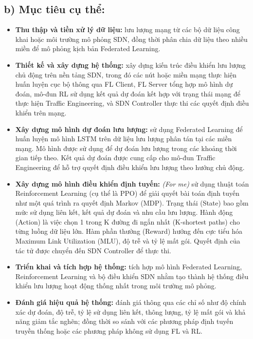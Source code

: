 \subsection*{b) Mục tiêu cụ thể:}
\begin{itemize}
    \item \textbf{Thu thập và tiền xử lý dữ liệu:} lưu lượng mạng từ các bộ dữ liệu công khai hoặc môi trường mô phỏng SDN, đồng thời phân chia dữ liệu theo nhiều miền để mô phỏng kịch bản Federated Learning.

    \item \textbf{Thiết kế và xây dựng hệ thống:} xây dựng kiến trúc điều khiển lưu lượng chủ động trên nền tảng SDN, trong đó các nút hoặc miền mạng thực hiện huấn luyện cục bộ thông qua FL Client, FL Server tổng hợp mô hình dự đoán, mô-đun RL sử dụng kết quả dự đoán kết hợp với trạng thái mạng để thực hiện Traffic Engineering, và SDN Controller thực thi các quyết định điều khiển trên mạng.

    \item \textbf{Xây dựng mô hình dự đoán lưu lượng:} sử dụng Federated Learning để huấn luyện mô hình LSTM trên dữ liệu lưu lượng phân tán tại các miền mạng. Mô hình được sử dụng để dự đoán lưu lượng trong các khoảng thời gian tiếp theo. Kết quả dự đoán được cung cấp cho mô-đun Traffic Engineering để hỗ trợ quyết định điều khiển lưu lượng theo hướng chủ động.

    \item \textbf{Xây dựng mô hình điều khiển định tuyến:} \textit{(For me)} sử dụng thuật toán Reinforcement Learning (cụ thể là PPO) để giải quyết bài toán định tuyến như một quá trình ra quyết định Markov (MDP). Trạng thái (State) bao gồm mức sử dụng liên kết, kết quả dự đoán và nhu cầu lưu lượng. Hành động (Action) là việc chọn 1 trong K đường đi ngắn nhất (K-shortest paths) cho từng luồng dữ liệu lớn. Hàm phần thưởng (Reward) hướng đến cực tiểu hóa Maximum Link Utilization (MLU), độ trễ và tỷ lệ mất gói. Quyết định của tác tử được chuyển đến SDN Controller để thực thi.

    \item \textbf{Triển khai và tích hợp hệ thống:} tích hợp mô hình Federated Learning, Reinforcement Learning và bộ điều khiển SDN nhằm tạo thành hệ thống điều khiển lưu lượng hoạt động thống nhất trong môi trường mô phỏng.

    \item \textbf{Đánh giá hiệu quả hệ thống:} đánh giá thông qua các chỉ số như độ chính xác dự đoán, độ trễ, tỷ lệ sử dụng liên kết, thông lượng, tỷ lệ mất gói và khả năng giảm tắc nghẽn; đồng thời so sánh với các phương pháp định tuyến truyền thống hoặc các phương pháp không sử dụng FL và RL.
\end{itemize}